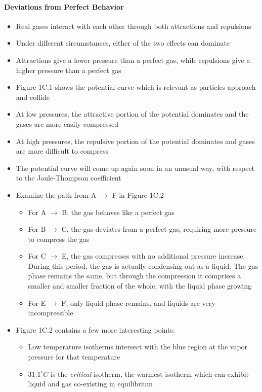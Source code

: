 \documentclass[12pt, openany, letterpaper]{memoir}
\begin{document}
\paragraph{Deviations from Perfect Behavior}
\begin{itemize}
	\item Real gases interact with each other through both attractions and repulsions
	\item Under different circumstances, either of the two effects can dominate
	\item Attractions give a lower pressure than a perfect gas, while repulsions give a higher pressure than a perfect gas
	\item Figure 1C.1 shows the potential curve which is relevant as particles approach and collide
	\item At low pressures, the attractive portion of the potential dominates and the gases are more easily compressed
	\item At high pressures, the repulsive portion of the potential dominates and gases are more difficult to compress
	\item The potential curve will come up again soon in an unusual way, with respect to the Joule-Thompson coefficient
	\item Examine the path from A $\rightarrow$ F in Figure 1C.2
	      \begin{itemize}
		      \item For A $\rightarrow$ B, the gas behaves like a perfect gas
		      \item For B $\rightarrow$ C, the gas deviates from a perfect gas, requiring more pressure to compress the gas
		      \item For C $\rightarrow$ E, the gas compresses with no additional pressure increase. During this period, the gas is actually condensing out as a liquid. The gas phase remains the same, but through the compression it comprises a smaller and smaller fraction of the whole, with the liquid phase growing
		      \item For E $\rightarrow$ F, only liquid phase remains, and liquids are very incompressible
	      \end{itemize}
	\item Figure 1C.2 contains a few more interesting points:
	      \begin{itemize}
		      \item Low temperature isotherms intersect with the blue region at the vapor pressure for that temperature
		      \item $31.1^{\circ}C$ is the \emph{critical} isotherm, the warmest isotherm which can exhibit liquid and gas co-existing in equilibrium

\end{itemize}
\end{itemize}
\end{document}

